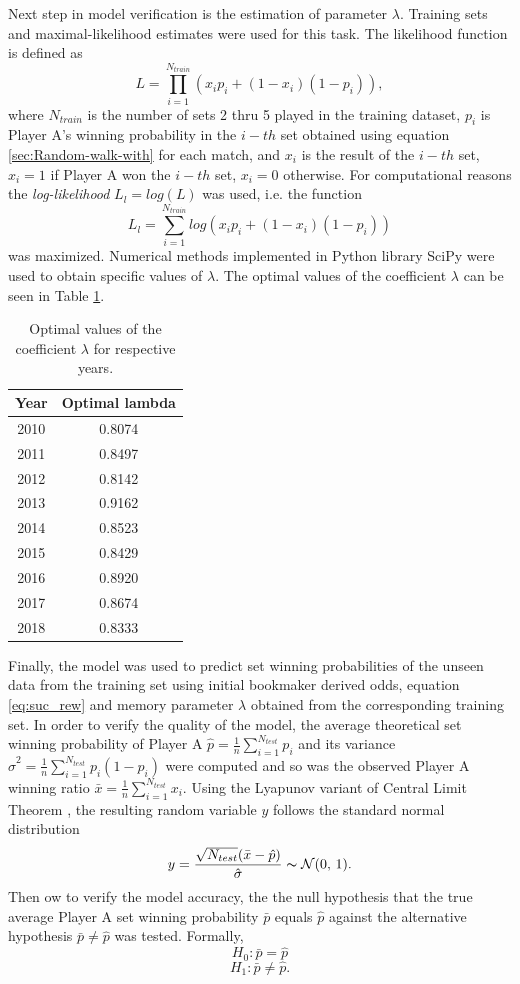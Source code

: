 \documentclass{easychair}
\begin{document}
Next step in model verification is the estimation of parameter $\lambda$.
Training sets and maximal-likelihood estimates were used for this
task. The likelihood function is defined as 
\[
L=\prod_{i=1}^{N_{train}}(x_{i}p_{i}+(1-x_{i})(1-p_{i})),
\]
where $N_{train}$ is the number of sets 2 thru 5 played in the training
dataset, $p_{i}$ is Player A's winning probability in the $i-th$
set obtained using equation \ref{sec:Random-walk-with} for each match,
and $x_{i}$ is the result of the $i-th$ set, $x_{i}=1$ if Player
A won the $i-th$ set, $x_{i}=0$ otherwise. For computational reasons
the \emph{log-likelihood }$L_{l}=log(L)$ was used, i.e. the function
\[
L_{l}=\sum_{i=1}^{N_{train}}log(x_{i}p_{i}+(1-x_{i})(1-p_{i}))
\]
was maximized. Numerical methods implemented in Python library SciPy
were used to obtain specific values of $\lambda$. The optimal values
of the coefficient $\lambda$ can be seen in Table \ref{tab:Optimal-values-of}.

\begin{table}
\begin{centering}
\begin{tabular}{|c|c|}
\hline 
Year & Optimal lambda\tabularnewline
\hline 
\hline 
2010 & 0.8074\tabularnewline
\hline 
2011 & 0.8497\tabularnewline
\hline 
2012 & 0.8142\tabularnewline
\hline 
2013 & 0.9162\tabularnewline
\hline 
2014 & 0.8523\tabularnewline
\hline 
2015 & 0.8429\tabularnewline
\hline 
2016 & 0.8920\tabularnewline
\hline 
2017 & 0.8674\tabularnewline
\hline 
2018 & 0.8333\tabularnewline
\hline 
\end{tabular}
\par\end{centering}
\caption{\label{tab:Optimal-values-of}Optimal values of the coefficient $\lambda$
for respective years.}

\end{table}

Finally, the model was used to predict set winning probabilities of
the unseen data from the training set using initial bookmaker derived
odds, equation \ref{eq:suc_rew} and memory parameter $\lambda$ obtained
from the corresponding training set. In order to verify the quality
of the model, the average theoretical set winning probability of Player
A $\hat{p}=\frac{1}{n}\sum_{i=1}^{N_{test}}p_{i}$ and its variance
$\hat{\sigma}^{2}=\frac{1}{n}\sum_{i=1}^{N_{test}}p_{i}(1-p_{i})$
were computed and so was the observed Player A winning ratio $\bar{x}=\frac{1}{n}\sum_{i=1}^{N_{test}}x_{i}$.
Using the Lyapunov variant of Central Limit Theorem \cite{billingsley1995probability},
the resulting random variable $y$ follows the standard normal distribution
\[
y=\frac{\sqrt{N_{test}}(\bar{x}-\hat{p})}{\hat{\sigma}}\thicksim\mathcal{N}(0,\,1).
\]
Then ow to verify the model accuracy, the the null hypothesis that
the true average Player A set winning probability $\bar{p}$ equals
$\hat{p}$ against the alternative hypothesis $\bar{p}\neq\hat{p}$
was tested. Formally, 
\[
H_{0}:\bar{p}=\hat{p}
\]
\[
H_{1}:\bar{p}\neq\hat{p}.
\]
\end{document}
